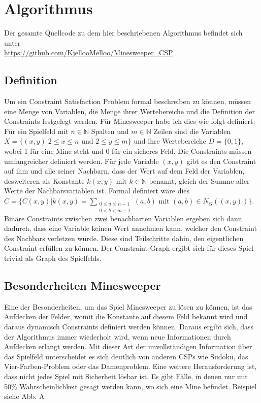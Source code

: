 %
\graphicspath{{chapters/images/}}
\section{Algorithmus}

Der gesamte Quellcode zu dem hier beschriebenen Algorithmus befindet sich unter\\
\url{https://github.com/KjellooMelloo/Minesweeper_CSP}

\subsection{Definition}

Um ein Constraint Satisfaction Problem formal beschreiben zu können, müssen eine Menge von Variablen, die Menge 
ihrer Wertebereiche und die Definition der Constraints festgelegt werden. Für Minesweeper habe ich dies wie folgt definiert:
Für ein Spielfeld mit $n\in \mathbb{N}$ Spalten und $m\in\mathbb{N}$ Zeilen sind
die Variablen $X=\{(x, y) | 2\le x\le n  \text{ und }  2\le y\le m\}$ und ihre Wertebereiche $D=\{0, 1\}$, wobei 1
für eine Mine steht und 0 für ein sicheres Feld.
Die Constraints müssen umfangreicher definiert werden. Für jede Variable $(x, y)$ gibt es den Constraint auf ihm und alle seiner 
Nachbarn, dass der Wert auf dem Feld der Variablen, desweiteren als Konstante $k(x, y) \text{ mit } k\in\mathbb{N}$ 
benannt, gleich der Summe aller Werte der Nachbarsvariablen ist. Formal definiert wäre dies
$C=\{C(x, y) | k(x, y) = \sum_{\substack{0\le a\le n-1\\0<b<m-1}}{(a, b)} \text{ mit } (a, b)\in N_G((x, y))\}$.
Binäre Constraints zwischen zwei benachbarten Variablen ergeben sich dann dadurch, dass eine Variable keinen Wert annehmen kann, 
welcher den Constraint des Nachbars verletzen würde. Diese sind Teilschritte dahin, den eigentlichen Constraint erfüllen zu können.
Der Constraint-Graph ergibt sich für dieses Spiel trivial als Graph des Spielfelds.

\subsection{Besonderheiten Minesweeper}

Eine der Besonderheiten, um das Spiel Minesweeper zu lösen zu können, ist das Aufdecken der Felder, womit die Konstante auf diesem Feld
bekannt wird und daraus dynamisch Constraints definiert werden können. Daraus ergibt sich, dass der Algorithmus immer wiederholt wird,
wenn neue Informationen durch Aufdecken erlangt werden. Mit dieser Art der unvollständigen Information über das Spielfeld unterscheidet es
sich deutlich von anderen CSPs wie Sudoku, das Vier-Farben-Problem oder das Damenproblem.
Eine weitere Herausforderung ist, dass nicht jedes Spiel mit Sicherheit lösbar ist. Es gibt Fälle, in denen nur mit 50\% Wahrscheinlichkeit
gesagt werden kann, wo sich eine Mine befindet. Beispiel siehe Abb. A

